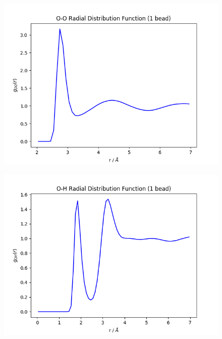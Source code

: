 \documentclass[12pt,reqno]{amsart}
\numberwithin{equation}{section}
\begin{document}
\begin{enumerate}
\begin{figure}[H]
\centering
\includegraphics[scale=0.6]{0_0-1bead-tip4pF.png}
\end{figure}

\begin{figure}[H]
\centering
\includegraphics[scale=0.6]{0_1-1bead-tip4pF.png}
\end{figure}


\end{enumerate}
\end{document}
